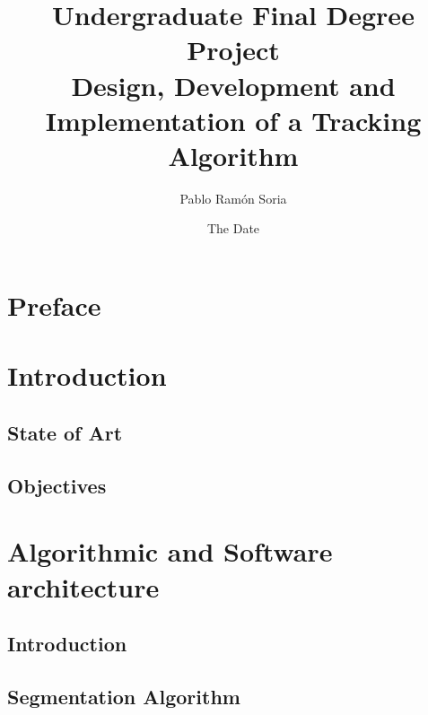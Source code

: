 \documentclass{book} %
\begin{document}
\frontmatter
\title{Undergraduate Final Degree Project \\ Design, Development and Implementation of a Tracking Algorithm}
\author{Pablo Ram\'on Soria}
\date{The Date}
\maketitle

\tableofcontents

\chapter{Preface}


\chapter{Introduction}
\section{State of Art}


\section{Objectives}


\mainmatter


\chapter{Algorithmic and Software architecture}
\section{Introduction}


\section{Segmentation Algorithm}

\end{document}
